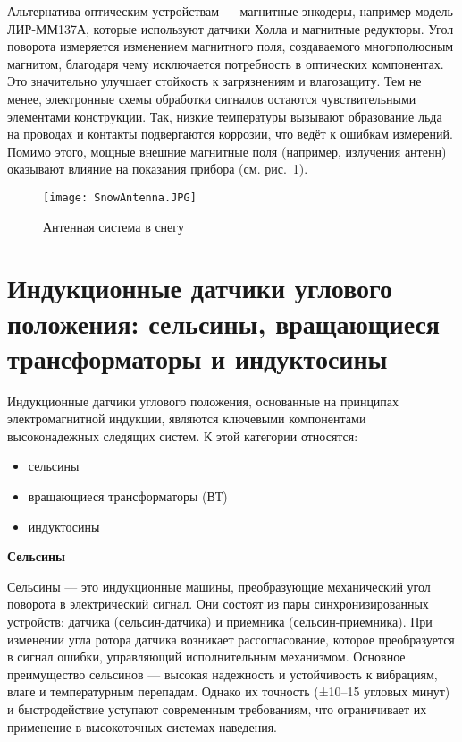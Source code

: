   Альтернатива оптическим устройствам — магнитные энкодеры, например модель ЛИР-ММ137А, 
  которые используют датчики Холла и магнитные редукторы. Угол поворота измеряется изменением магнитного поля, создаваемого многополюсным магнитом, 
  благодаря чему исключается потребность в оптических компонентах. 
  Это значительно улучшает стойкость к загрязнениям и влагозащиту. 
  Тем не менее, электронные схемы обработки сигналов остаются чувствительными элементами конструкции. 
  Так, низкие температуры вызывают образование льда на проводах и контакты подвергаются коррозии, что ведёт к ошибкам измерений. 
  Помимо этого, мощные внешние магнитные поля (например, излучения антенн) оказывают влияние на показания прибора (см. рис.~\ref{SnowAntenna}).
  \begin{figure}[!t]
    \centering
    \texttt{[image: SnowAntenna.JPG]}
    \caption{Антенная система в снегу}
    \label{SnowAntenna}
  \end{figure}


\newpage
\section{Индукционные датчики углового положения: сельсины, вращающиеся трансформаторы и индуктосины}

Индукционные датчики углового положения, основанные на принципах электромагнитной индукции, являются ключевыми компонентами высоконадежных следящих систем. 
К этой категории относятся: 
\begin{itemize} \item сельсины \item вращающиеся трансформаторы (ВТ) \item  индуктосины \end{itemize}

\textbf{Сельсины}

Сельсины — это индукционные машины, преобразующие механический угол поворота в электрический сигнал. Они состоят из пары синхронизированных устройств: датчика (сельсин-датчика) 
и приемника (сельсин-приемника). При изменении угла ротора датчика возникает рассогласование, которое преобразуется в сигнал ошибки, управляющий исполнительным механизмом.
Основное преимущество сельсинов — высокая надежность и устойчивость к вибрациям, влаге и температурным перепадам. Однако их точность (±10–15 угловых минут) 
и быстродействие уступают современным требованиям, что ограничивает их применение в высокоточных системах наведения.

